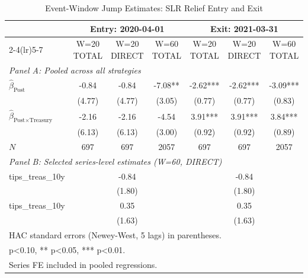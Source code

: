 \begin{table}[ht]
\centering
\caption{Event-Window Jump Estimates: SLR Relief Entry and Exit}
\label{tab:jump_repaired}
\small
\begin{tabular}{lcccccc}
\hline\hline
 & \multicolumn{3}{c}{Entry: 2020-04-01} & \multicolumn{3}{c}{Exit: 2021-03-31} \\
\cmidrule(lr){2-4}\cmidrule(lr){5-7}
 & W=20 TOTAL & W=20 DIRECT & W=60 TOTAL & W=20 TOTAL & W=20 DIRECT & W=60 TOTAL \\
\hline
\multicolumn{7}{l}{\textit{Panel A: Pooled across all strategies}} \\
$\hat\beta_{\text{Post}}$ & -0.84 & -0.84 & -7.08** & -2.62*** & -2.62*** & -3.09*** \\
 & (4.77) & (4.77) & (3.05) & (0.77) & (0.77) & (0.83) \\
$\hat\beta_{\text{Post}\times\text{Treasury}}$ & -2.16 & -2.16 & -4.54 & 3.91*** & 3.91*** & 3.84*** \\
 & (6.13) & (6.13) & (3.00) & (0.92) & (0.92) & (0.89) \\
$N$ & 697 & 697 & 2057 & 697 & 697 & 2057 \\
\hline
\multicolumn{7}{l}{\textit{Panel B: Selected series-level estimates (W=60, DIRECT)}} \\
tips\_treas\_10y & \multicolumn{3}{c}{-0.84} & \multicolumn{3}{c}{-0.84} \\
 & \multicolumn{3}{c}{(1.80)} & \multicolumn{3}{c}{(1.80)} \\
tips\_treas\_10y & \multicolumn{3}{c}{0.35} & \multicolumn{3}{c}{0.35} \\
 & \multicolumn{3}{c}{(1.63)} & \multicolumn{3}{c}{(1.63)} \\
\hline\hline
\multicolumn{7}{l}{\footnotesize HAC standard errors (Newey-West, 5 lags) in parentheses.} \\
\multicolumn{7}{l}{\footnotesize * p<0.10, ** p<0.05, *** p<0.01.} \\
\multicolumn{7}{l}{\footnotesize Series FE included in pooled regressions.} \\
\end{tabular}
\end{table}